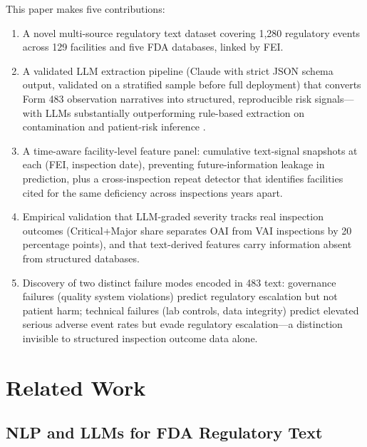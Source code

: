\documentclass[12pt]{article}
\begin{document}
This paper makes five contributions:
\begin{enumerate}[noitemsep]
  \item A novel multi-source regulatory text dataset covering 1,280 regulatory
        events across 129 facilities and five FDA databases, linked by FEI.
  \item A validated LLM extraction pipeline (Claude with strict JSON schema
        output, validated on a stratified sample before full deployment) that
        converts Form 483 observation narratives into structured, reproducible
        risk signals---with LLMs substantially outperforming rule-based
        extraction on contamination and patient-risk inference
        \citep{Li2026LLMDevice}.
  \item A time-aware facility-level feature panel: cumulative text-signal
        snapshots at each (FEI, inspection date), preventing future-information
        leakage in prediction, plus a cross-inspection repeat detector that
        identifies facilities cited for the same deficiency across inspections
        years apart.
  \item Empirical validation that LLM-graded severity tracks real inspection
        outcomes (Critical+Major share separates OAI from VAI inspections by
        20 percentage points), and that text-derived features carry information
        absent from structured databases.
  \item Discovery of two distinct failure modes encoded in 483 text: governance
        failures (quality system violations) predict regulatory escalation but
        not patient harm; technical failures (lab controls, data integrity)
        predict elevated serious adverse event rates but evade regulatory
        escalation---a distinction invisible to structured inspection outcome
        data alone.
\end{enumerate}

\section{Related Work}
\label{sec:lit}

\subsection{NLP and LLMs for FDA Regulatory Text}
\end{document}
